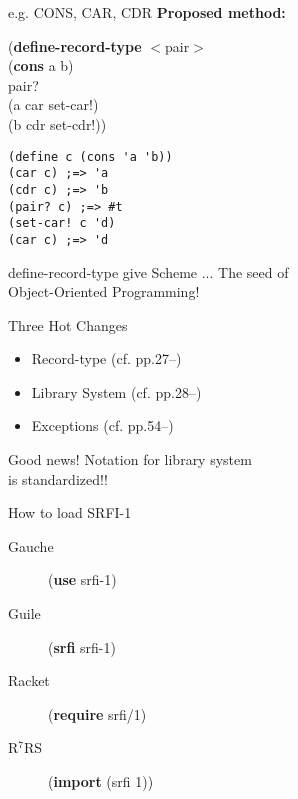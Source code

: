 \documentclass[dvipdfm,12pt,fleqn]{beamer}
\begin{document}
\begin{frame}[containsverbatim]{e.g. CONS, CAR, CDR}
\textbf{Proposed method:}
\begin{screen}
(\textbf{define-record-type} $<$pair$>$\\
\hspace{1em}(\textbf{cons} a b)\\
\hspace{1em}pair?\\
\hspace{1em}(a car set-car!)\\
\hspace{1em}(b cdr set-cdr!))
\end{screen}

\begin{multicols}{2}
\begin{verbatim}
(define c (cons 'a 'b))
(car c) ;=> 'a
(cdr c) ;=> 'b
(pair? c) ;=> #t
(set-car! c 'd)
(car c) ;=> 'd
\end{verbatim}
\end{multicols}
\end{frame}

\begin{frame}{define-record-type give Scheme ...}
\Huge\pause
The seed of\\
\alert{Object-Oriented} Programming!
\end{frame}

\begin{frame}{Three Hot Changes\footnotemark[1]}
\huge
\begin{itemize}
\item Record-type (cf. pp.27--)
\item \alert{Library System} (cf. pp.28--)
\item Exceptions (cf. pp.54--)
\end{itemize}

\end{frame}

\begin{frame}{Good news!}
\huge
Notation for library system\\
is \alert{standardized}!!
\end{frame}

\begin{frame}{How to load SRFI-1}
\Huge
\begin{description}
\item[Gauche] (\textbf{use} srfi-1)
\item[Guile] (\textbf{srfi} srfi-1)
\item[Racket] (\textbf{require} srfi/1)
\pause
\item[R$^7$RS] (\alert{\textbf{import}} (srfi 1))
\end{description}
\end{frame}
\end{document}
